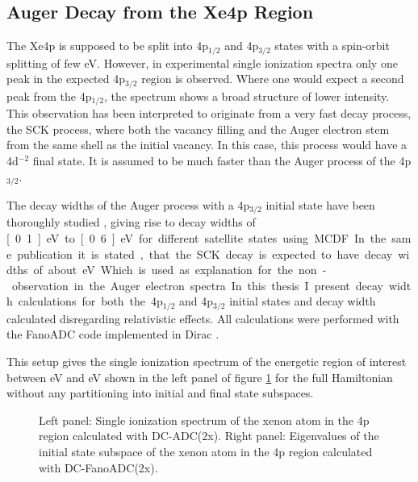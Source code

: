 \subsection{Auger Decay from the Xe4p Region}
The Xe4p is supposed to be split into 4p$_{1/2}$ and 4p$_{3/2}$ states with
a spin-orbit splitting of few \unit{eV}. However, in experimental single
ionization spectra only one peak in the expected 4p$_{3/2}$ region is observed.
Where one would expect a second peak from the 4p$_{1/2}$, the spectrum shows
a broad structure of lower intensity. This observation has been interpreted
to originate from a very fast decay process, the \ac{SCK} process, where both the
vacancy filling and the Auger electron stem from the same shell as the initial
vacancy. In this case, this process would have a 4d$^{-2}$ final state.
It is assumed to be much faster than the Auger process
of the 4p$_{3/2}$. 

The decay widths of the Auger process with a 4p$_{3/2}$ initial state have
been thoroughly studied \cite{}, giving rise to decay widths of \unit[0.1]{eV} to
\unit[0.6]{eV} for different satellite states using \ac{MCDF}. In the same publication
it is stated, that the \ac{SCK} decay is expected to have decay widths of
about \unit[10--100]{eV}. Which is used as explanation for the non-observation
in the Auger electron spectra.

In this thesis I present decay width calculations for both the 4p$_{1/2}$ and
4p$_{3/2}$ initial states and decay width calculated disregarding relativistic
effects.
All calculations were performed with the FanoADC code implemented in
Dirac \cite{DIRAC13}.%

This setup gives the single ionization spectrum of the energetic region of
interest between \unit[140]{eV} and \unit[170]{eV} shown in the left panel of
figure
\ref{figure:Xe4p_SIPs} for the full Hamiltonian without any partitioning
into initial and final state subspaces.

\begin{figure}[h]
  \centering
  
  
  \caption{Left panel: Single ionization spectrum of the xenon atom in the 4p region
           calculated with DC-ADC(2x).
           Right panel: Eigenvalues of the initial state subspace of the                 
           xenon atom in the 4p region                                      
           calculated with DC-FanoADC(2x).}
  \label{figure:Xe4p_SIPs}
\end{figure}

